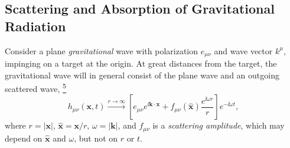 
\subsection{Scattering and Absorption of Gravitational Radiation}\label{sec:10.6}

Consider a plane \emph{gravitational} wave with polarization \(e_{\mu\nu}\)
and wave vector \(k^\mu\), impinging on a target at the origin. At great
distances from the target, the gravitational wave will in general consist of
the plane wave and an outgoing scattered wave,%
\hyperref[ch10-ref-5]{\textsuperscript{5}}
\begin{equation}
  h_{\mu\nu}(\mathbf{x},t)
  \xrightarrow{r\to\infty}
  \left[
    e_{\mu\nu}e^{\ii\mathbf{k}\cdot\mathbf{x}}
    +f_{\mu\nu}(\widehat{\mathbf{x}})\frac{e^{\ii\omega r}}{r}
  \right]e^{-\ii\omega t},
  \tag{10.6.1}\label{eq:10.6.1}
\end{equation}
where \(r=\lvert\mathbf{x}\rvert\),
\(\widehat{\mathbf{x}}=\mathbf{x}/r\),
\(\omega=\lvert\mathbf{k}\rvert\), and \(f_{\mu\nu}\) is a
\emph{scattering amplitude}, which may depend on
\(\widehat{\mathbf{x}}\) and \(\omega\), but not on \(r\) or \(t\).

